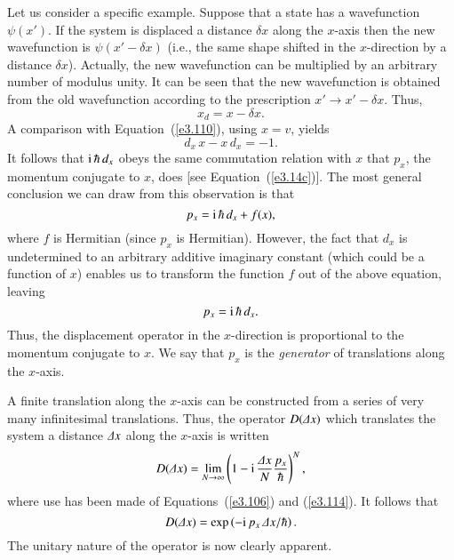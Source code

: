 Let us consider a specific example. 
Suppose that a state has a wavefunction $\psi(x')$. If the system is displaced
a distance $\delta x$ along the $x$-axis then the new wavefunction is
$\psi(x'-\delta x)$ ({\rm i.e.}, the same shape shifted in the $x$-direction
by a distance $\delta x$). Actually, the new wavefunction can be multiplied by
an arbitrary number of modulus unity. It can be seen that the new wavefunction  
is obtained from the old wavefunction according to the 
prescription  $x'\rightarrow x'- \delta x$. Thus,
\begin{equation}
x_d = x -\delta x.
\end{equation}
A comparison  with Equation~(\ref{e3.110}), using  $x=v$, yields
\begin{equation}
d_x \,x - x\,d_x = -1.
\end{equation}
It follows that ${\rm i}\,\hbar\, d_x$ obeys the same commutation relation with 
$x$ that $p_x$, the momentum conjugate to $x$, does [see Equation~(\ref{e3.14c})]. 
The most general conclusion we can draw from this observation is that
\begin{equation}
p_x = {\rm i}\,\hbar\, d_x + f(x),
\end{equation}
where $f$ is Hermitian (since $p_x$ is Hermitian). However, the fact that $d_x$
is undetermined to an arbitrary additive imaginary constant (which could be a function
of $x$) enables us to transform the function $f$ out of the above equation, leaving
\begin{equation}\label{e3.114}
p_x = {\rm i}\,\hbar\, d_x.
\end{equation}
Thus, the displacement operator in the $x$-direction is proportional to the
momentum conjugate to $x$. We say that $p_x$ is the {\em generator}\/ of translations
along the $x$-axis. 

A finite translation along the $x$-axis can be constructed from 
a series of very many
infinitesimal translations. Thus, the operator $D({\mit\Delta} x)$ which translates the
system a distance ${\mit\Delta} x$ along the $x$-axis is
written
\begin{equation}
D({\mit\Delta} x) =
\lim_{N\rightarrow \infty}
 \left(1-{\rm i}\, \frac{{\mit\Delta} x}{N} \frac{p_x}{\hbar}\right)^N,
\end{equation}
where use has been made of Equations~(\ref{e3.106}) and (\ref{e3.114}). It follows that
\begin{equation}\label{e3.116}
D({\mit\Delta} x) = \exp\left({-\rm i} \,p_x\,{\mit\Delta} x /\hbar\right).
\end{equation}
The unitary nature of the operator is now clearly apparent.


